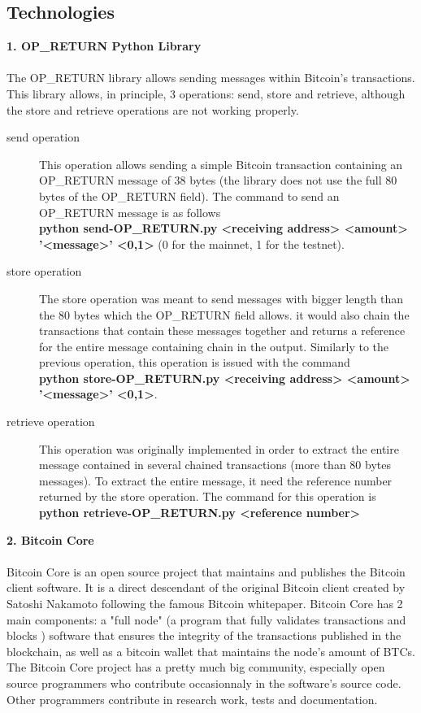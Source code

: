 \subsection{Technologies}
\vspace*{0.5cm}
\textbf{1. OP\_RETURN Python Library}\\
\\
The OP\_RETURN library allows sending messages within Bitcoin's transactions. This library allows, in principle, 3 operations: send, store and retrieve, although the store and retrieve operations are not working properly.
\begin{description}
\item[send operation] This operation allows sending a simple Bitcoin transaction containing an OP\_RETURN message of  38 bytes (the library does not use the full 80 bytes of the OP\_RETURN field). The command to send an OP\_RETURN message is as follows \\ \textbf{python send-OP\_RETURN.py <receiving address> <amount> '<message>' <0,1>  } (0 for the mainnet, 1 for the testnet).
\item[store operation] The store operation was meant to send messages with bigger length than the 80 bytes which the OP\_RETURN field allows. it would also chain the transactions that contain these messages together and returns a reference for the entire message containing chain in the output. Similarly to the previous operation, this operation is issued with the command \\ \textbf{python store-OP\_RETURN.py <receiving address> <amount> '<message>' <0,1>}.
\item[retrieve operation] This operation was originally implemented in order to extract the entire message contained in several chained transactions (more than 80 bytes messages). To extract the entire message, it need the reference number returned by the store operation. The command for this operation is \\ \textbf{python retrieve-OP\_RETURN.py <reference number>}\\
\end{description} 
\newpage
\textbf{2. Bitcoin Core \cite{core}}\\
\\
Bitcoin Core is an open source project that maintains and publishes the Bitcoin client software. It is a direct descendant of the original Bitcoin client created by Satoshi Nakamoto following the famous Bitcoin whitepaper. Bitcoin Core has 2 main components: a "full node" (a program that fully validates transactions and blocks \cite {node}) software that ensures the integrity of the transactions published in the blockchain, as well as a bitcoin wallet that maintains the node's amount of BTCs. The Bitcoin Core project has a pretty much big community, especially open source programmers who contribute occasionnaly in the software's source code. Other programmers contribute in research work, tests and documentation.\\
